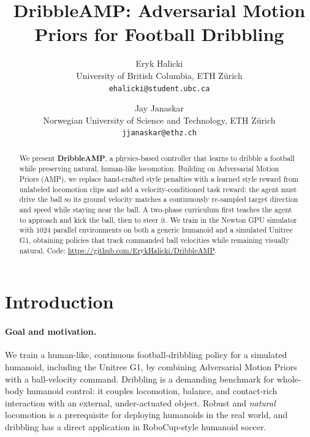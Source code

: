 \documentclass[10pt,twocolumn,letterpaper]{article}
\begin{document}
\title{DribbleAMP: Adversarial Motion Priors for Football Dribbling}

\author{Eryk Halicki\\
University of British Columbia, ETH Z\"urich\\
{\tt\small ehalicki@student.ubc.ca}
\and
Jay Janaskar\\
Norwegian University of Science and Technology, ETH Z\"urich\\
{\tt\small jjanaskar@ethz.ch}
}
\maketitle

\begin{abstract}
   We present \textbf{DribbleAMP}, a physics-based controller that learns to
   dribble a football while preserving natural, human-like locomotion. Building
   on Adversarial Motion Priors (AMP), we replace hand-crafted style penalties
   with a learned style reward from unlabeled locomotion clips and add a
   velocity-conditioned task reward: the agent must drive the ball so its ground
   velocity matches a continuously re-sampled target direction and speed while
   staying near the ball. A two-phase curriculum first teaches the agent to
   approach and kick the ball, then to steer it. We train in the Newton GPU
   simulator with $1024$ parallel environments on both a generic humanoid and a
   simulated Unitree G1, obtaining policies that track commanded ball velocities
   while remaining visually natural. Code:
   \url{https://github.com/ErykHalicki/DribbleAMP}.
\end{abstract}

\section{Introduction}
\label{sec:intro}

\paragraph{Goal and motivation.}
We train a human-like, continuous football-dribbling policy for a simulated
humanoid, including the Unitree G1, by combining Adversarial Motion
Priors~\cite{peng2021amp} with a ball-velocity command. Dribbling is a demanding
benchmark for whole-body humanoid control: it couples locomotion, balance, and
contact-rich interaction with an external, under-actuated object. Robust and
\emph{natural} locomotion is a prerequisite for deploying humanoids in the real
world, and dribbling has a direct application in RoboCup-style humanoid soccer.
\end{document}
